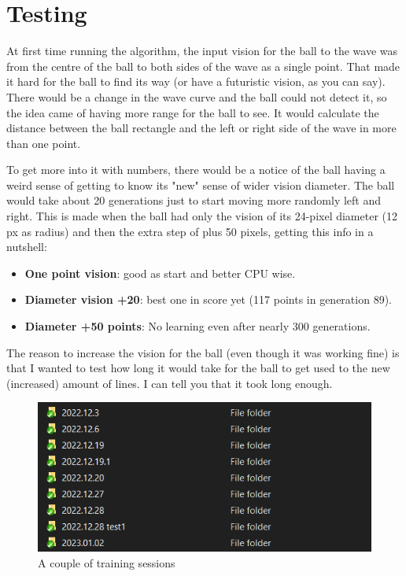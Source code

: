 \chapter{Testing}
At first time running the algorithm, the input vision for the ball to the wave was from the centre of the ball to both sides of the wave as a single point. That made it hard for the ball to find its way (or have a futuristic vision, as you can say). There would be a change in the wave curve and the ball could not detect it, so the idea came of having more range for the ball to see. It would calculate the distance between the ball rectangle and the left or right side of the wave in more than one point.

To get more into it with numbers, there would be a notice of the ball having a weird sense of getting to know its "new" sense of wider vision diameter. The ball would take about 20 generations just to start moving more randomly left and right. This is made when the ball had only the vision of its 24-pixel diameter (12 px as radius) and then the extra step of plus 50 pixels, getting this info in a nutshell:
\begin{itemize}
	\item \textbf{One point vision}: good as start and better CPU wise.
	\item \textbf{Diameter vision +20}: best one in score yet (117 points in generation 89).
	\item \textbf{Diameter +50 points}: No learning even after nearly 300 generations.
\end{itemize}

The reason to increase the vision for the ball (even though it was working fine) is that I wanted to test how long it would take for the ball to get used to the new (increased) amount of lines. I can tell you that it took long enough.

\begin{figure}[H]
	\centering
	\includegraphics[width=0.7\linewidth]{usedImages/numTrainingSessions}
	\caption{A couple of training sessions}
	\label{fig:numtrainingsessions}
\end{figure}


